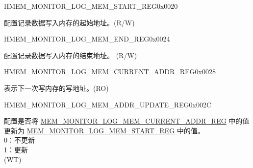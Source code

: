 \begin{register}{H}{MEM\_MONITOR\_LOG\_MEM\_START\_REG}{0x0020}\label{regdesc:MEMMONITORLOGMEMSTARTREG}
%
\regnewline%
\begin{regdesc}\begin{reglist}
\label{fielddesc:MEMMONITORLOGMEMSTART}\item [MEM\_MONITOR\_LOG\_MEM\_START] 配置记录数据写入内存的起始地址。(R/W)
\end{reglist}\end{regdesc}
\end{register}


\begin{register}{H}{MEM\_MONITOR\_LOG\_MEM\_END\_REG}{0x0024}\label{regdesc:MEMMONITORLOGMEMENDREG}
%
\regnewline%
\begin{regdesc}\begin{reglist}
\label{fielddesc:MEMMONITORLOGMEMEND}\item [MEM\_MONITOR\_LOG\_MEM\_END] 配置记录数据写入内存的结束地址。 (R/W)
\end{reglist}\end{regdesc}
\end{register}


\begin{register}{H}{MEM\_MONITOR\_LOG\_MEM\_CURRENT\_ADDR\_REG}{0x0028}\label{regdesc:MEMMONITORLOGMEMCURRENTADDRREG}
%
\regnewline%
\begin{regdesc}\begin{reglist}
\label{fielddesc:MEMMONITORLOGMEMCURRENTADDR}\item [MEM\_MONITOR\_LOG\_MEM\_CURRENT\_ADDR] 表示下一次写内存的写地址。(RO)
\end{reglist}\end{regdesc}
\end{register}


\begin{register}{H}{MEM\_MONITOR\_LOG\_MEM\_ADDR\_UPDATE\_REG}{0x002C}\label{regdesc:MEMMONITORLOGMEMADDRUPDATEREG}
%
%
\regnewline%
\begin{regdesc}\begin{reglist}
\label{fielddesc:MEMMONITORLOGMEMADDRUPDATE}\item [MEM\_MONITOR\_LOG\_MEM\_ADDR\_UPDATE] 配置是否将 \hyperref[regdesc:MEMMONITORLOGMEMCURRENTADDRREG]{MEM\_MONITOR\_LOG\_MEM\_CURRENT\_ADDR\_REG} 中的值更新为 \hyperref[regdesc:MEMMONITORLOGMEMSTARTREG]{MEM\_MONITOR\_LOG\_MEM\_START\_REG} 中的值。\\
0：不更新 \\
1：更新 \\ (WT)
\end{reglist}\end{regdesc}
\end{register}


